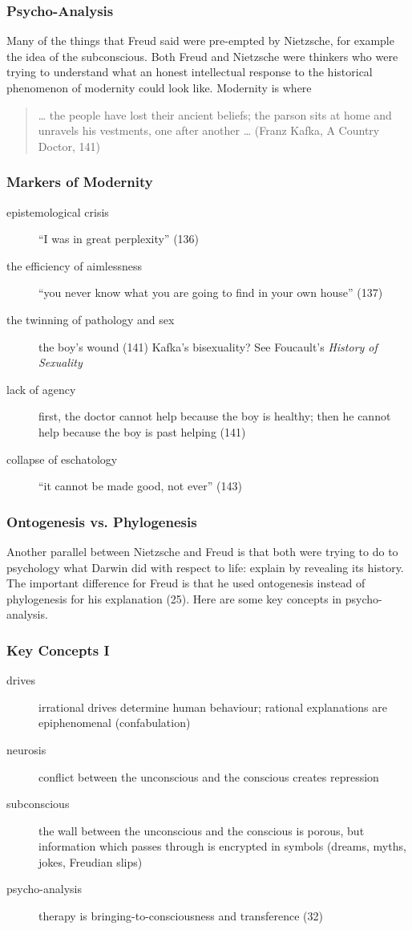 \documentclass[xcolor=dvipsnames]{beamer}
\begin{document}
\begin{frame}
  \frametitle{Psycho-Analysis} 
  Many of the things that Freud said were pre-empted by Nietzsche, for
  example the idea of the subconscious. Both Freud and Nietzsche were
  thinkers who were trying to understand what an honest intellectual
  response to the historical phenomenon of modernity could look like.
  Modernity is where
\begin{quote}
  {\ldots} the people have lost their ancient beliefs; the parson sits
  at home and unravels his vestments, one after another {\ldots}
  (Franz Kafka, A Country Doctor, 141)
\end{quote}
\end{frame}

\begin{frame}
  \frametitle{Markers of Modernity} 
  \begin{description}
  \item[epistemological crisis] ``I was in great perplexity'' (136)
  \item[the efficiency of aimlessness] ``you never know what you are
    going to find in your own house'' (137)
  \item[the twinning of pathology and sex] the boy's wound (141)
    Kafka's bisexuality? See Foucault's \emph{History of Sexuality}
  \item[lack of agency] first, the doctor cannot help because the boy
    is healthy; then he cannot help because the boy is past helping (141)
  \item[collapse of eschatology] ``it cannot be made good, not ever''
    (143)
  \end{description}
\end{frame}

\begin{frame}
  \frametitle{Ontogenesis vs. Phylogenesis} Another parallel between
  Nietzsche and Freud is that both were trying to do to psychology
  what Darwin did with respect to life: explain by revealing its
  history. The important difference for Freud is that he used
  \alert{ontogenesis} instead of \alert{phylogenesis} for his
  explanation (25). Here are some key concepts in psycho-analysis.
\end{frame}

\begin{frame}
  \frametitle{Key Concepts I} 
  \begin{description}
  \item[drives] irrational drives determine human behaviour; rational
    explanations are epiphenomenal (confabulation)
  \item[neurosis] conflict between the unconscious and the conscious
    creates repression
  \item[subconscious] the wall between the unconscious and the
    conscious is porous, but information which passes through is
    encrypted in symbols (dreams, myths, jokes, Freudian slips)
  \item[psycho-analysis] therapy is bringing-to-consciousness and
    transference (32)
  \end{description}
\end{frame}
\end{document}
